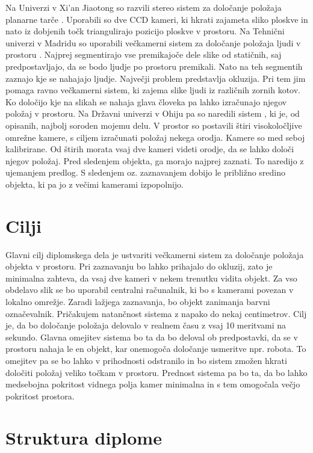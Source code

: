 \documentclass[a4paper, 12pt]{book}
\begin{document}
Na Univerzi v Xi’an Jiaotong so razvili stereo sistem za določanje položaja planarne tarče \cite{li2008development}. Uporabili so dve CCD \cite{wiki:ccd} kameri, ki hkrati zajameta sliko ploskve in nato iz dobjenih točk triangulirajo pozicijo ploskve v prostoru. Na Tehnični univerzi v Madridu so uporabili večkamerni sistem za določanje položaja ljudi v prostoru \cite{mohedano2008robust}. Najprej segmentirajo vse premikajoče dele slike od statičnih, saj predpostavljajo, da se bodo ljudje po prostoru premikali. Nato na teh segmentih zaznajo kje se nahajajo ljudje. Največji problem predstavlja okluzija. Pri tem jim pomaga ravno večkamerni sistem, ki zajema slike ljudi iz različnih zornih kotov. Ko določijo kje na slikah se nahaja glava človeka pa lahko izračunajo njegov položaj v prostoru. Na Državni univerzi v Ohiju pa so naredili sistem \cite{lee2013real}, ki je, od opisanih, najbolj soroden mojemu delu. V prostor so postavili štiri visokoločljive omrežne kamere, s ciljem izračunati položaj nekega orodja. Kamere so med seboj kalibrirane. Od štirih morata vsaj dve kameri videti orodje, da se lahko določi njegov položaj. Pred sledenjem objekta, ga morajo najprej zaznati. To naredijo z ujemanjem predlog. S sledenjem oz. zaznavanjem dobijo le približno sredino objekta, ki pa jo z večimi kamerami izpopolnijo.

\section{Cilji}
Glavni cilj diplomskega dela je ustvariti večkamerni sistem za določanje položaja objekta v prostoru. Pri zaznavanju bo lahko prihajalo do okluzij, zato je minimalna zahteva, da vsaj dve kameri v nekem trenutku vidita objekt. Za vso obdelavo slik se bo uporabil centralni računalnik, ki bo s kamerami povezan v lokalno omrežje. Zaradi lažjega zaznavanja, bo objekt zanimanja barvni označevalnik. Pričakujem natančnost sistema z napako do nekaj centimetrov. Cilj je, da bo določanje položaja delovalo v realnem času z vsaj 10 meritvami na sekundo. Glavna omejitev sistema bo ta da bo deloval ob predpostavki, da se v prostoru nahaja le en objekt, kar onemogoča določanje usmeritve npr. robota. To omejitev pa se bo lahko v prihodnosti odstranilo in bo sistem zmožen hkrati določiti položaj veliko točkam v prostoru. Prednost sistema pa bo ta, da bo lahko medsebojna pokritost vidnega polja kamer minimalna in s tem omogočala večjo pokritost prostora.

\section{Struktura diplome}
\end{document}
